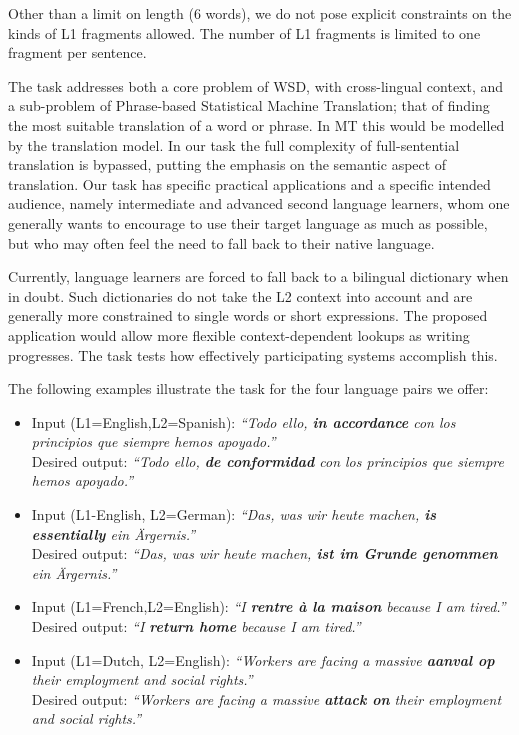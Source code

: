 Other than a limit on length (6 words), we do not pose explicit constraints on
the kinds of L1 fragments allowed. The number of L1 fragments is limited to one
fragment per sentence.

The task addresses both a core problem of WSD, with cross-lingual context, and
a sub-problem of Phrase-based Statistical Machine Translation; that of finding
the most suitable translation of a word or phrase.  In MT this would be
modelled by the translation model. In our task the full complexity of
full-sentential translation is bypassed, putting the emphasis on the semantic
aspect of translation. Our task has specific practical applications and a
specific intended audience, namely intermediate and advanced second language
learners, whom one generally wants to encourage to use their target language as
much as possible, but who may often feel the need to fall back to their native
language.

Currently, language learners are forced to fall back to a bilingual dictionary
when in doubt. Such dictionaries do not take the L2 context into account and
are generally more constrained to single words or short expressions. The
proposed application would allow more flexible context-dependent lookups as
writing progresses. The task tests how effectively participating systems
accomplish this.

The following examples illustrate the task for the four language pairs we
offer:


\begin{itemize}
  \item
    Input (L1=English,L2=Spanish): \emph{“Todo ello, \textbf{ in accordance}  con los principios que siempre hemos apoyado.”} \\
    Desired output: \emph{“Todo ello,  \textbf{de conformidad} con los principios que siempre hemos apoyado.”}
  \item
    Input (L1-English, L2=German): \emph{“Das, was wir heute machen, \textbf{is essentially} ein Ärgernis.”} \\
    Desired output: \emph{“Das, was wir heute machen, \textbf{ist im Grunde genommen} ein Ärgernis.”}
  \item
    Input (L1=French,L2=English): \emph{“I \textbf{rentre à la maison} because
    I am tired.”} \\
    Desired output: \emph{“I \textbf{return home} because I am tired.”}
  \item
    Input (L1=Dutch, L2=English): \emph{“Workers are facing a massive \textbf{aanval
    op} their employment and social rights.”} \\
    Desired output: \emph{“Workers are facing a massive \textbf{attack on}
    their employment and social rights.”}
\end{itemize}


